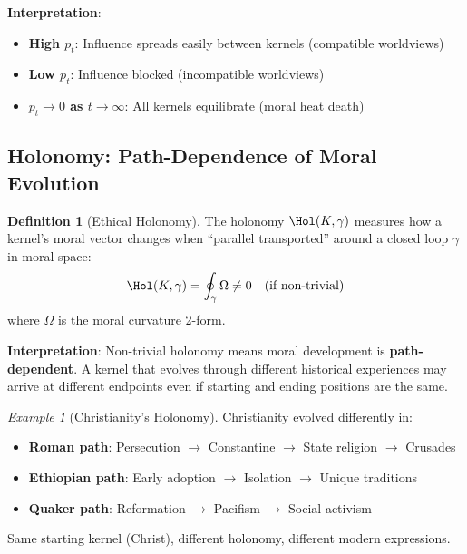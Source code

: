\documentclass[11pt,a4paper]{article}
\theoremstyle{definition}
\newtheorem{definition}[theorem]{Definition}
\theoremstyle{remark}
\newtheorem{example}{Example}[section]
\begin{document}
\textbf{Interpretation}:
\begin{itemize}
    \item \textbf{High $p_t$}: Influence spreads easily between kernels (compatible worldviews)
    \item \textbf{Low $p_t$}: Influence blocked (incompatible worldviews)
    \item \textbf{$p_t \to 0$ as $t \to \infty$}: All kernels equilibrate (moral heat death)
\end{itemize}

\subsection{Holonomy: Path-Dependence of Moral Evolution}

\begin{definition}[Ethical Holonomy]
\label{def:holonomy}
The holonomy $\Hol(K, \gamma)$ measures how a kernel's moral vector changes when ``parallel transported'' around a closed loop $\gamma$ in moral space:
\begin{equation}
    \Hol(K, \gamma) = \oint_\gamma \Omega \neq 0 \quad \text{(if non-trivial)}
    \label{eq:holonomy}
\end{equation}
where $\Omega$ is the moral curvature 2-form.
\end{definition}

\textbf{Interpretation}: Non-trivial holonomy means moral development is \textbf{path-dependent}. A kernel that evolves through different historical experiences may arrive at different endpoints even if starting and ending positions are the same.

\begin{example}[Christianity's Holonomy]
Christianity evolved differently in:
\begin{itemize}
    \item \textbf{Roman path}: Persecution $\to$ Constantine $\to$ State religion $\to$ Crusades
    \item \textbf{Ethiopian path}: Early adoption $\to$ Isolation $\to$ Unique traditions
    \item \textbf{Quaker path}: Reformation $\to$ Pacifism $\to$ Social activism
\end{itemize}
Same starting kernel (Christ), different holonomy, different modern expressions.
\end{example}

\end{document}
